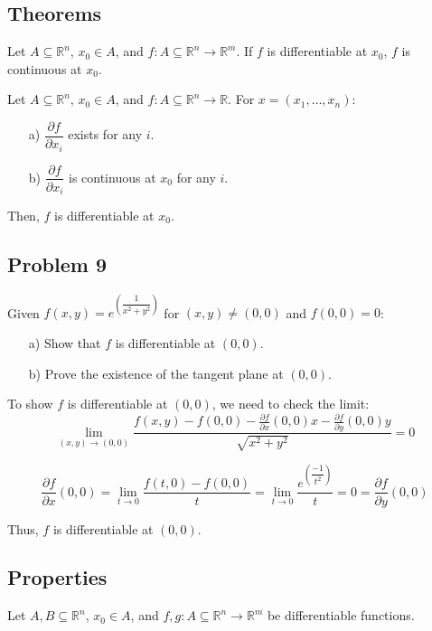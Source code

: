 \documentclass[11pt]{article}
\begin{document}
\subsection{Theorems}
Let \( A \subseteq \mathbb{R}^n \), \( x_0 \in A \), and \( f: A \subseteq \mathbb{R}^n \rightarrow \mathbb{R}^m \). If \( f \) is differentiable at \( x_0 \), \( f \) is continuous at \( x_0 \).


Let \( A \subseteq \mathbb{R}^n \), \( x_0 \in A \), and \( f: A \subseteq \mathbb{R}^n \rightarrow \mathbb{R} \). For \( x = (x_1, \ldots, x_n) \):
\begin{itemize}
    \item[a)] \( \dfrac{\partial f}{\partial x_i} \) exists for any \( i \).
    \item[b)] \( \dfrac{\partial f}{\partial x_i} \) is continuous at \( x_0 \) for any \( i \).
\end{itemize}
Then, \( f \) is differentiable at \( x_0 \).

\subsection*{Problem 9}
Given \( f(x,y) = e^{\left(\dfrac{1}{x^2 + y^2}\right)} \) for \( (x,y) \neq (0,0) \) and \( f(0,0) = 0 \):
\begin{itemize}
    \item[a)] Show that \( f \) is differentiable at \( (0,0) \).
    \item[b)] Prove the existence of the tangent plane at \( (0,0) \).
\end{itemize}

To show \( f \) is differentiable at \( (0,0) \), we need to check the limit:
\[
\lim_{(x,y) \to (0,0)} \frac{f(x,y) - f(0,0) - \frac{\partial f}{\partial x}(0,0)x - \frac{\partial f}{\partial y}(0,0)y}{\sqrt{x^2 + y^2}} = 0
\]

\[
\dfrac{\partial f}{\partial x} (0,0) = \lim_{t \to 0} \frac{f(t,0) - f(0,0)}{t} = \lim_{t \to 0} \frac{e^{\left(\dfrac{-1}{t^2}\right)}}{t} = 0 = \frac{\partial f}{\partial y} (0,0)
\]

Thus, \( f \) is differentiable at \( (0,0) \).

\subsection{Properties}

Let \( A, B \subseteq \mathbb{R}^n \), \( x_0 \in A \), and \( f, g : A \subseteq \mathbb{R}^n \rightarrow \mathbb{R}^m \) be differentiable functions.
\end{document}
